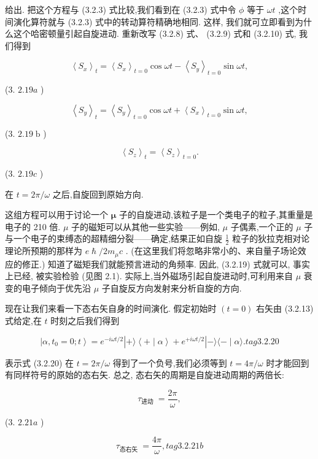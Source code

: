 给出. 把这个方程与 (3.2.3) 式比较,我们看到在 (3.2.3) 式中令 $\phi$ 等于 ${\omega t}$ ,这个时间演化算符就与 (3.2.3) 式中的转动算符精确地相同. 这样, 我们就可立即看到为什么这个哈密顿量引起自旋进动. 重新改写 (3.2.8) 式、 (3.2.9) 式和 (3.2.10) 式, 我们得到

$$
{\left\langle {S}_{x}\right\rangle }_{t} = {\left\langle {S}_{x}\right\rangle }_{t = 0}\cos {\omega t} - {\left\langle {S}_{y}\right\rangle }_{t = 0}\sin {\omega t},
$$

(3. ${2.19a}$ )

$$
{\left\langle {S}_{y}\right\rangle }_{t} = {\left\langle {S}_{y}\right\rangle }_{t = 0}\cos {\omega t} + {\left\langle {S}_{x}\right\rangle }_{t = 0}\sin {\omega t},
$$

(3. ${2.19}\mathrm{\;b}$ )

$$
{\left\langle {S}_{z}\right\rangle }_{t} = {\left\langle {S}_{z}\right\rangle }_{t = 0}.
$$

(3. ${2.19c}$ )

在 $t = {2\pi }/\omega$ 之后,自旋回到原始方向.

这组方程可以用于讨论一个 $\mathbf{\mu }$ 子的自旋进动,该粒子是一个类电子的粒子,其重量是电子的 210 倍. $\mu$ 子的磁矩可以从其他一些实验——例如, $\mu$ 子偶素,一个正的 $\mu$ 子与一个电子的束缚态的超精细分裂——确定,结果正如自旋 $\frac{1}{2}$ 粒子的狄拉克相对论理论所预期的那样为 $e\hslash /2{m}_{\mu }c$ . (在这里我们将忽略非常小的、来自量子场论效应的修正.) 知道了磁矩我们就能预言进动的角频率. 因此, (3.2.19) 式就可以, 事实上已经, 被实验检验 (见图 2.1). 实际上,当外磁场引起自旋进动时,可利用来自 $\mu$ 衰变的电子倾向于优先沿 $\mu$ 子自旋反方向发射来分析自旋的方向.

现在让我们来看一下态右矢自身的时间演化. 假定初始时 $\left( {t = 0}\right)$ 右矢由 (3.2.13) 式给定,在 $t$ 时刻之后我们得到

$$
\left| {\alpha ,{t}_{0} = 0;t}\right\rangle = {e}^{-{i\omega t}/2}\left| {+\rangle \left\langle {+ \mid \alpha }\right\rangle + {e}^{+{i\omega t}/2}}\right| - \rangle \langle - \mid \alpha \rangle . tag{3.2.20}
$$

表示式 (3.2.20) 在 $t = {2\pi }/\omega$ 得到了一个负号,我们必须等到 $t = {4\pi }/\omega$ 时才能回到有同样符号的原始的态右矢. 总之, 态右矢的周期是自旋进动周期的两倍长:

$$
{\tau }_{\text{进动 }} = \frac{2\pi }{\omega },
$$

(3. ${2.21a}$ )

$$
{\tau }_{\text{态右矢 }} = \frac{4\pi }{\omega }, tag{3.2.21b}
$$

